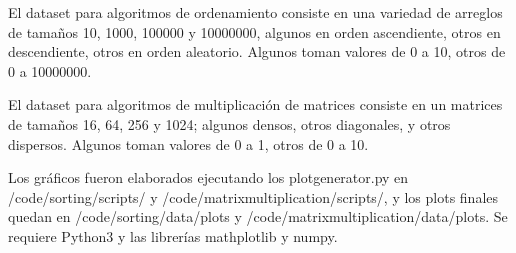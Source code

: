 
El dataset para algoritmos de ordenamiento consiste en una variedad de arreglos de tamaños 10, 1000, 100000 y 10000000, algunos en orden ascendiente, otros en descendiente, otros en orden aleatorio. Algunos toman valores de 0 a 10, otros de 0 a 10000000.

El dataset para algoritmos de multiplicación de matrices consiste en un matrices de tamaños 16, 64, 256 y 1024; algunos densos, otros diagonales, y otros dispersos. Algunos toman valores de 0 a 1, otros de 0 a 10.

Los gráficos fueron elaborados ejecutando los plot\textunderscore generator.py en /code/sorting/scripts/ y /code/matrix\textunderscore multiplication/scripts/, y los plots finales quedan en /code/sorting/data/plots y /code/matrix\textunderscore multiplication/data/plots. Se requiere Python3 y las librerías mathplotlib y numpy.